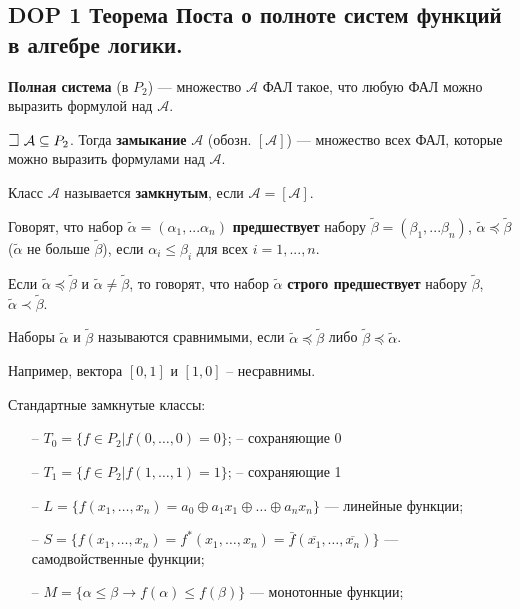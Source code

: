 \subsection*{DOP 1 Теорема Поста о полноте систем функций в алгебре логики.}


\textbf{Полная система} (в $P_2$) --- множество $\mathcal{A}$ ФАЛ такое, что любую ФАЛ можно выразить формулой над $\mathcal{A}$.

$\mathLet ~ \mathcal{A} \subseteq P_2$. Тогда \textbf{замыкание} $\mathcal{A}$ (обозн. $[\mathcal{A}]$) --- множество всех ФАЛ, которые можно выразить формулами над $\mathcal{A}$.

Класс $\mathcal{A}$ называется \textbf{замкнутым}, если $\mathcal{A} = [\mathcal{A}]$.

Говорят, что набор $\tilde{\alpha} = (\alpha_1, ... \alpha_n)$ \textbf{предшествует} набору $\tilde{\beta} = (\beta_1, ... \beta_n)$,  $\tilde{\alpha} \preccurlyeq \tilde{\beta}$ ($\tilde{\alpha}$ не больше $\tilde{\beta}$), если $\alpha_i \leqslant \beta_i$ для всех $i = 1, ..., n$.

Если $\tilde{\alpha} \preccurlyeq \tilde{\beta}$ и $\tilde{\alpha} \neq \tilde{\beta}$, то говорят, что набор $\tilde{\alpha}$ \textbf{строго предшествует} набору $\tilde{\beta}$, $\tilde{\alpha} \prec \tilde{\beta}$.

Наборы $\tilde{\alpha}$ и $\tilde{\beta}$ называются сравнимыми, если $\tilde{\alpha} \preccurlyeq \tilde{\beta}$ либо $\tilde{\beta} \preccurlyeq \tilde{\alpha}$.

Например, вектора $[0, 1]$ и $[1, 0]$ -- несравнимы.

Стандартные замкнутые классы:
\begin{itemize}
    \item[--] $T_0 = \{f \in P_2 | f(0, \dots, 0) = 0\}$; -- сохраняющие 0
    \item[--] $T_1 = \{f \in P_2 | f(1, \dots, 1) = 1\}$; -- сохраняющие 1
    \item[--] $L = \{f(x_1, \dots, x_n) = a_0 \oplus a_1 x_1 \oplus \dots \oplus a_n x_n\}$ --- линейные функции;
    \item[--] $S = \{f(x_1, \dots, x_n) = f^*(x_1, \dots, x_n) = \bar{f}(\overline{x_1}, \dots, \overline{x_n})\}$ --- самодвойственные функции;
    \item[--] $M = \{\alpha \leqslant \beta \rightarrow f(\alpha) \leqslant f(\beta)\}$ --- монотонные функции;
\end{itemize}

